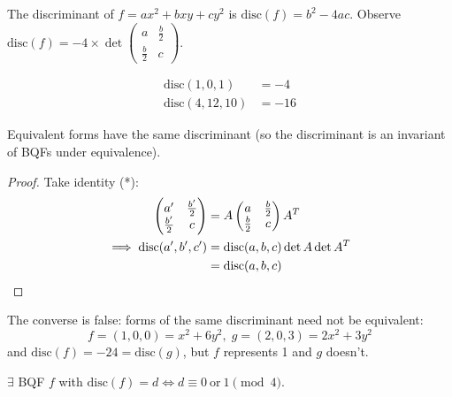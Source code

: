 \documentclass{article}
\begin{document}
\begin{defi}
    The discriminant of $f = ax^2 + b x y + c y^2$ is $\mathrm{disc}(f) = b^2 - 4ac$.
    Observe $\mathrm{disc}(f) = -4 \times \det\begin{pmatrix}a & \frac{b}{2} \\ \frac{b}{2} & c\end{pmatrix}$.
\end{defi}

\begin{eg}
    \begin{align*}
        \mathrm{disc}(1, 0, 1) &= -4 \\
        \mathrm{disc}(4, 12, 10) &= -16
    \end{align*}
\end{eg}

\begin{nlemma}
    Equivalent forms have the same discriminant (so the discriminant is an invariant of BQFs under equivalence).
\end{nlemma}

\begin{proof}
    Take identity (*):
    \begin{align*}
        \begin{pmatrix}
            a' & \frac{b'}{2} \\ \frac{b'}{2} & c
        \end{pmatrix}
        &=
        A
        \begin{pmatrix}
            a & \frac{b}{2} \\ \frac{b}{2} & c
        \end{pmatrix}
        A^T \\
        \implies \mathrm{disc}(a', b', c') &= \mathrm{disc}(a, b, c) \det A \det A^T \\
                                           &= \mathrm{disc}(a, b, c) \qedhere
    \end{align*}
\end{proof}

\begin{remark}
    The converse is false: forms of the same discriminant need not be equivalent:
    \begin{equation*}
        f = (1, 0, 0) = x^2 + 6y^2, \; g = (2, 0, 3) = 2x^2 + 3y^2
    \end{equation*}
    and $\mathrm{disc}(f) = -24 = \mathrm{disc}(g)$, but $f$ represents 1 and $g$ doesn't.
\end{remark}

\begin{nlemma}
    $\exists$ BQF $f$ with $\mathrm{disc}(f) = d \iff d \equiv 0 \ \text{or}\ 1 \pmod{4}$.
\end{nlemma}
\end{document}
